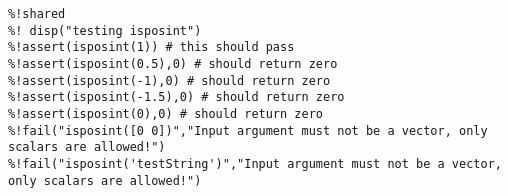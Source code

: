 \begin{verbatim}
%!shared
%! disp("testing isposint")
%!assert(isposint(1)) # this should pass
%!assert(isposint(0.5),0) # should return zero
%!assert(isposint(-1),0) # should return zero
%!assert(isposint(-1.5),0) # should return zero
%!assert(isposint(0),0) # should return zero
%!fail("isposint([0 0])","Input argument must not be a vector, only scalars are allowed!")
%!fail("isposint('testString')","Input argument must not be a vector, only scalars are allowed!")
\end{verbatim}
